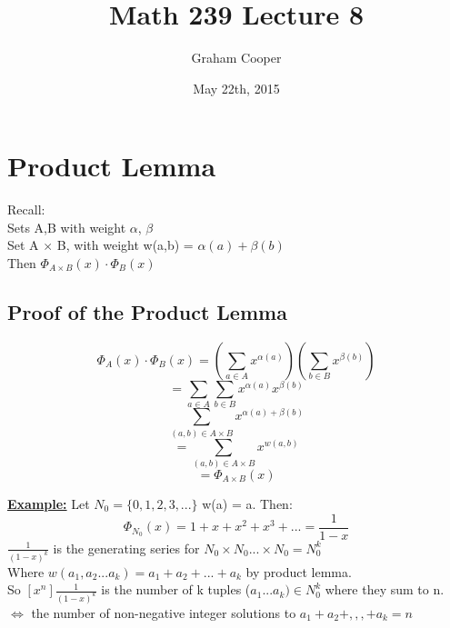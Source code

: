 \documentclass[12pt]{article}
\title{\vspace{-15ex}Math 239 Lecture 8\vspace{-1ex}}
\date{May 22th, 2015}
\author{Graham Cooper}
\newcommand{\myt}[1]{\textbf{\underline{#1}}}
\begin{document}
	\maketitle
	
	\section*{Product Lemma}
	Recall:\\
	
	Sets A,B with weight $\alpha$, $\beta$\\
	Set A $\times$ B, with weight w(a,b) = $\alpha(a) + \beta(b)$\\
	Then $\Phi_{A\times B}(x) \cdot \Phi_B(x)$\\
	
	\subsection*{Proof of the Product Lemma}
	$$\Phi_A(x) \cdot \Phi_B(x) = (\sum_{a \in A}x^{\alpha(a)})(\sum_{b \in B}x^{\beta(b)})$$
	$$= \sum_{a \in A}\sum_{b \in B}x^{\alpha(a)}x^{\beta(b)}$$
	$$\sum_{(a,b) \in A \times B}x^{\alpha(a) + \beta(b)}$$
	$$= \sum_{(a,b) \in A \times B}x^{w(a,b)}$$
	$$= \Phi_{A\times B}(x)$$
	
	\myt{Example:} Let $N_0 = \{0,1,2,3,...\}$ w(a) = a. Then:\\
	
	$$\Phi_{N_0}(x) = 1 + x + x^2 + x^3 + ... = \frac{1}{1-x}$$
	$\frac{1}{(1-x)^k}$ is the generating series for $N_0 \times N_0 ... \times N_0 = N_0^k$\\
	Where $w(a_1,a_2...a_k) = a_1 + a_2 + ... + a_k$ by product lemma.\\
	
	So $[x^n]\frac{1}{(1-x)^k}$ is the number of k tuples ($a_1...a_k) \in N_0^k$ where they sum to n.\\
	$\iff$ the number of non-negative integer solutions to $a_1 + a_2 + ,,, + a_k = n$\\
	
	
	
\end{document}
